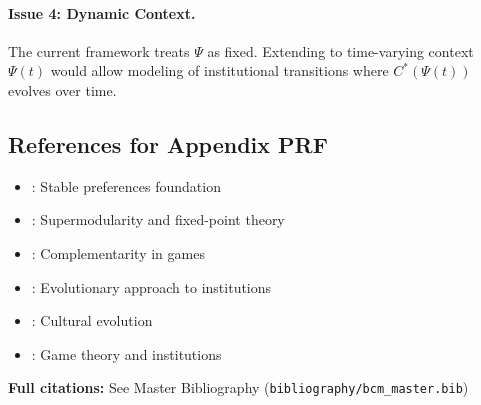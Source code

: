 \paragraph{Issue 4: Dynamic Context.}
The current framework treats $\Psi$ as fixed. Extending to time-varying
context $\Psi(t)$ would allow modeling of institutional transitions
where $C^*(\Psi(t))$ evolves over time.


\subsection{References for Appendix PRF}
\label{sec:D-references}

\begin{itemize}[nosep]
    \item \citet{stiglerbecker1977}: Stable preferences foundation
    \item \citet{topkis1998}: Supermodularity and fixed-point theory
    \item \citet{milgromroberts1990compare}: Complementarity in games
    \item \citet{bowles2004}: Evolutionary approach to institutions
    \item \citet{boydricherson}: Cultural evolution
    \item \citet{gintis2007}: Game theory and institutions
\end{itemize}

\textbf{Full citations:} See Master Bibliography (\texttt{bibliography/bcm\_master.bib})


